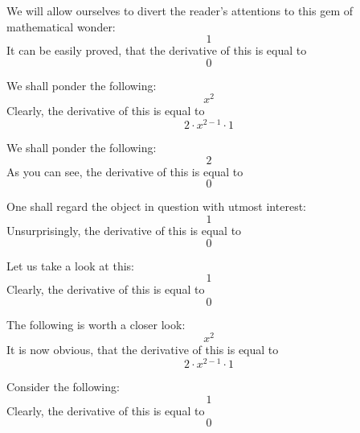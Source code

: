 \documentclass{article}
\begin{document}
We will allow ourselves to divert the reader's attentions to this gem of mathematical wonder:
\begin{equation}
1 
\end{equation}
It can be easily proved, that the derivative of this is equal to
\begin{equation}
0 
\end{equation}

We shall ponder the following:
\begin{equation}
x ^{2 } 
\end{equation}
Clearly, the derivative of this is equal to
\begin{equation}
2 \cdot x ^{2 - 1 } \cdot 1 
\end{equation}

We shall ponder the following:
\begin{equation}
2 
\end{equation}
As you can see, the derivative of this is equal to
\begin{equation}
0 
\end{equation}

One shall regard the object in question with utmost interest:
\begin{equation}
1 
\end{equation}
Unsurprisingly, the derivative of this is equal to
\begin{equation}
0 
\end{equation}

Let us take a look at this:
\begin{equation}
1 
\end{equation}
Clearly, the derivative of this is equal to
\begin{equation}
0 
\end{equation}

The following is worth a closer look:
\begin{equation}
x ^{2 } 
\end{equation}
It is now obvious, that the derivative of this is equal to
\begin{equation}
2 \cdot x ^{2 - 1 } \cdot 1 
\end{equation}

Consider the following:
\begin{equation}
1 
\end{equation}
Clearly, the derivative of this is equal to
\begin{equation}
0 
\end{equation}
\end{document}

